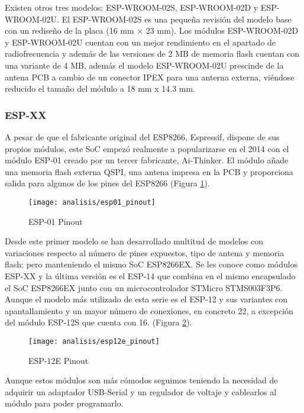 \documentclass[../proyecto.tex]{subfiles}
\begin{document}
Existen otros tres modelos: ESP-WROOM-02S, ESP-WROOM-02D y ESP-WROOM-02U. El ESP-WROOM-02S \cite{espwrooms2_datasheet} es una pequeña revisión del modelo base con un rediseño de la placa (16 mm × 23 mm). Los módulos ESP-WROOM-02D y ESP-WROOM-02U  \cite{espwroom02d_02u} cuentan con un mejor rendimiento en el apartado de radiofrecuencia y además de las versiones de 2 MB de memoria flash cuentan con una variante de 4 MB, además el modelo ESP-WROOM-02U prescinde de la antena PCB a cambio de un conector IPEX para una anterna externa, viéndose reducido el tamaño del módulo a 18 mm x 14.3 mm.\\

\subsubsection{ESP-XX}

A pesar de que el fabricante original del ESP8266, Espressif, dispone de sus propios módulos, este SoC empezó realmente a popularizarse en el 2014 con el módulo ESP-01 creado por un tercer fabricante, Ai-Thinker. El módulo añade una memoria flash externa QSPI, una antena impresa en la PCB y proporciona salida para algunos de los pines del ESP8266 (Figura \ref{fig:esp01_pinout}).\\

\begin{figure}[h]
\centering
\texttt{[image: analisis/esp01\_pinout]}
\caption{ESP-01 Pinout}
\label{fig:esp01_pinout}
\end{figure}

Desde este primer modelo se han desarrollado multitud de modelos con variaciones respecto al número de pines expuestos, tipo de antena y memoria flash; pero manteniendo el mismo SoC ESP8266EX. Se les conoce como módulos ESP-XX y la última versión es el ESP-14 que combina en el mismo encapsulado el SoC ESP8266EX junto con un microcontrolador STMicro STMS003F3P6. Aunque el modelo más utilizado de esta serie es el ESP-12 y sus variantes con apantallamiento y un mayor número de conexiones, en concreto 22, a excepción del módulo ESP-12S que cuenta con 16. (Figura \ref{fig:esp12e_pinout}).\\

\begin{figure}[H]
\centering
\texttt{[image: analisis/esp12e\_pinout]}
\caption{ESP-12E Pinout}
\label{fig:esp12e_pinout}
\end{figure}

Aunque estos módulos son más cómodos seguimos teniendo la necesidad de adquirir un adaptador USB-Serial y un regulador de voltaje y cablearlos al módulo para poder programarlo.\\
\end{document}
